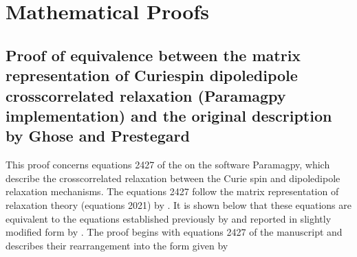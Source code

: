 \documentclass[a4paper,10pt,english,openany,oneside]{sphinxmanual}
\begin{document}
\section{Mathematical Proofs}
\label{\detokenize{mathematical_proofs:mathematical-proofs}}\label{\detokenize{mathematical_proofs::doc}}

\subsection{Proof of equivalence between the matrix representation of Curie\sphinxhyphen{}spin dipole\textendash{}dipole cross\sphinxhyphen{}correlated relaxation (Paramagpy implementation) and the original description by Ghose and Prestegard}
\label{\detokenize{mathematical_proofs:proof-of-equivalence-between-the-matrix-representation-of-curie-spin-dipole-dipole-cross-correlated-relaxation-paramagpy-implementation-and-the-original-description-by-ghose-and-prestegard}}
\sphinxAtStartPar
This proof concerns equations 24\sphinxhyphen{}27 of the  on the software Paramagpy, which describe the cross\sphinxhyphen{}correlated relaxation between the Curie spin and dipole\textendash{}dipole relaxation mechanisms. The equations 24\sphinxhyphen{}27 follow the matrix representation of relaxation theory (equations 20\sphinxhyphen{}21) by  . It is shown below that these equations are equivalent to the equations established previously by  and reported in slightly modified form by . The proof begins with equations 24\sphinxhyphen{}27 of the manuscript and describes their rearrangement into the form given by 
\end{document}
